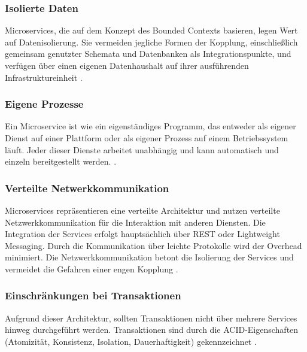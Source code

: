 {\subsubsection{Isolierte Daten}

Microservices, die auf dem Konzept des Bounded Contexts basieren, legen Wert auf Datenisolierung. Sie vermeiden jegliche Formen der Kopplung, einschließlich gemeinsam genutzter Schemata und Datenbanken als Integrationspunkte, und verfügen über einen eigenen Datenhaushalt auf ihrer ausführenden Infrastruktureinheit \cite[S. 2, 31-37]{wolff} \cite[S.255]{richards}.

\subsubsection{Eigene Prozesse}

Ein Microservice ist wie ein eigenständiges Programm, das entweder als eigener Dienst auf einer Plattform oder als eigener Prozess auf einem Betriebssystem läuft. Jeder dieser Dienste arbeitet unabhängig und kann automatisch und einzeln bereitgestellt werden.\cite[S.23]{newman} \cite[S.253]{richards} \cite[S. 2, 31-37]{wolff} \cite[S.154-157]{sommerville}.

\subsubsection{Verteilte Netwerkkommunikation}
Microservices repräsentieren eine verteilte Architektur und nutzen verteilte Netzwerkkommunikation für die Interaktion mit anderen Diensten. Die Integration der Services erfolgt hauptsächlich über REST oder Lightweight Messaging. Durch die Kommunikation über leichte Protokolle wird der Overhead minimiert. Die Netzwerkkommunikation betont die Isolierung der Services und vermeidet die Gefahren einer engen Kopplung \cite[S.253]{richards} \cite[S. 2, 31-37]{wolff} \cite[S.154-157]{sommerville} \cite[S.128]{dowalil} \cite[S.23]{newman}.

\subsubsection{Einschränkungen bei Transaktionen}

Aufgrund dieser Architektur, sollten Transaktionen nicht über mehrere Services hinweg durchgeführt werden. Transaktionen sind durch die ACID-Eigenschaften (Atomizität, Konsistenz, Isolation, Dauerhaftigkeit) gekennzeichnet \cite[S.253]{richards} \cite[S. 2, 31-37]{wolff}.

}
